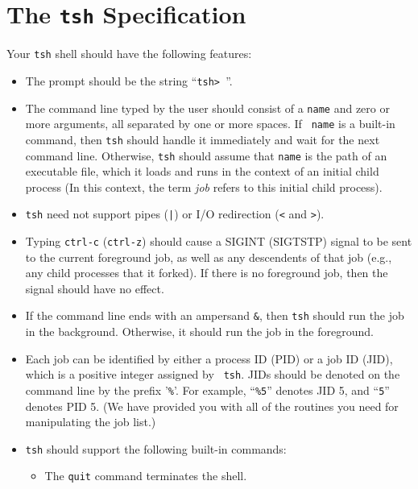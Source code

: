 \documentclass[11pt]{article}
\begin{document}
\section*{The {\tt tsh} Specification}

Your {\tt tsh} shell should have the following features:

\begin{itemize}
\item The prompt should be the string ``{\tt tsh> }''.

\item The command line typed by the user should consist of a {\tt name} and
zero or more arguments, all separated by one or more spaces.  If {\tt
name} is a built-in command, then {\tt tsh} should handle it immediately and
wait for the next command line. Otherwise, {\tt tsh} should assume that
{\tt name} is the path of an executable file, which it loads and runs
in the context of an initial child process (In this context, the term
{\em job} refers to this initial child process).

\item {\tt tsh} need not support pipes ({\tt |}) or
I/O redirection ({\tt <} and {\tt >}). 

\item Typing {\tt ctrl-c} ({\tt ctrl-z}) should cause a SIGINT (SIGTSTP)
signal to be sent to the current foreground job, as well as any
descendents of that job (e.g., any child processes that it forked).
If there is no foreground job, then the signal should have no effect.

\item 
If the command line ends with an ampersand {\tt \&}, then {\tt tsh} should
run the job in the background. Otherwise, it should run the job in the
foreground. 

\item Each job can be identified by either a process ID (PID) or a job
ID (JID), which is a positive integer assigned by {\tt
tsh}. JIDs should be denoted on the command line by the prefix
'\verb:%:'. For example, ``{\tt \%5}'' denotes JID 5, and ``{\tt 5}''
denotes PID 5. (We have provided you with all of the routines you need
for manipulating the job list.)

\item {\tt tsh} should support the following built-in commands:
\begin{itemize}
\item 
The {\tt quit} command terminates the shell.


\end{itemize}
\end{itemize}
\end{document}
